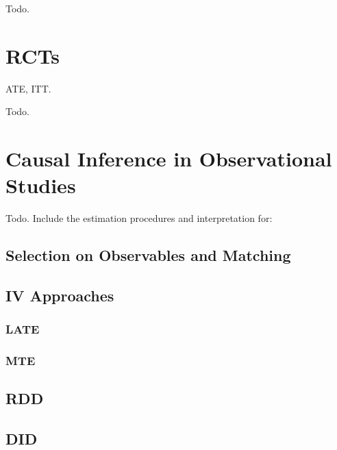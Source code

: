 \documentclass[twoside]{article}
\begin{document}
Todo.

\section{RCTs}

ATE, ITT.

Todo.

\section{Causal Inference in Observational Studies}
Todo. Include the estimation procedures and interpretation for:
\subsection{Selection on Observables and Matching}
\subsection{IV Approaches}
\subsubsection{LATE}
\subsubsection{MTE}
\subsection{RDD}
\subsection{DID}


\end{document}
